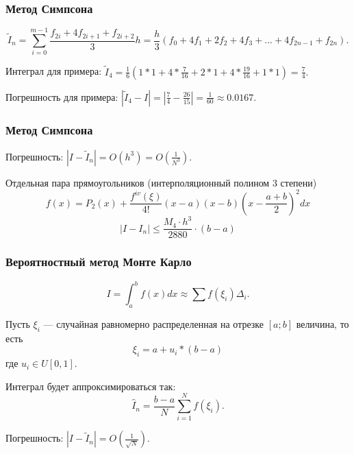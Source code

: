 \documentclass[10pt]{beamer}
\begin{document}
\begin{frame}[fragile]
\frametitle{Метод Симпсона}
$$
\tilde{I}_n = \sum_{i=0}^{m-1} \frac{f_{2i} + 4 f_{2i+1} + f_{2i+2}}{3} h = \frac{h}{3} \left( f_0 + 4 f_1 + 2 f_2 + 4 f_3 + ...  + 4 f_{2n-1} + f_{2n} \right) .
$$
\vfill
\begin{center}
\end{center}

Интеграл для примера: 
$\tilde{I}_4 = \frac{1}{6} \left( 1 * 1 + 4 * \frac{7}{16} + 2 * 1 + 4 * \frac{19}{16} + 1 * 1 \right) = \frac{7}{4}.$

Погрешность для примера: 
$|\tilde{I}_4 - I| = \left|\frac{7}{4} - \frac{26}{15}\right| = \frac{1}{60} \approx 0.0167.$
\end{frame}

\begin{frame}[fragile]
\frametitle{Метод Симпсона}

Погрешность: $|I - \tilde{I}_n| = O(h^3) = O \left(\frac{1}{N^3} \right)$.

\vfill 

Отдельная пара прямоугольников (интерполяционный полином 3 степени)
$$ f(x) = P_2(x) + \frac{f^{iv}(\xi)}{4!} (x - a) (x - b) (x - \frac{a+b}{2})^2 dx$$
$$ \left|I - I_n \right| \leqslant \frac{M_4 \cdot h^3}{2880} \cdot (b-a)$$
\end{frame}


\begin{frame}[fragile]
\frametitle{Вероятностный метод Монте Карло}

$$I = \int_{a}^{b} f(x) dx \approx \sum{f(\xi_i)} \Delta_i.$$

Пусть $\xi_i$ --- случайная равномерно распределенная на отрезке $[a; b]$ величина, то есть
$$\xi_i = a + u_i * (b - a)$$
где $u_i \in U[0, 1]$.

Интеграл будет аппроксимироваться так:
$$\hat{I}_n = \frac{b-a}{N} \sum_{i=1}^{N}{f(\xi_i)}.$$

Погрешность: $|I - \tilde{I}_n| = O \left( \frac{1}{\sqrt{N}} \right) $.
\end{frame}
\end{document}
